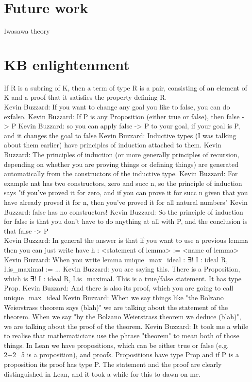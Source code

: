 \documentclass[10pt, a4paper]{article}
\begin{document}
\section{Future work}
Iwasawa theory

\section{KB enlightenment}
If R is a subring of K, then a term of type R is a pair, consisting of an element of K and a proof that it satisfies the property defining R. \\

Kevin Buzzard: If you want to change any goal you like to false, you can do exfalso.
Kevin Buzzard: If P is any Proposition (either true or false), then false -> P
Kevin Buzzard: so you can apply false -> P to your goal, if your goal is P, and it changes the goal to false
Kevin Buzzard: Inductive types (I was talking about them earlier) have principles of induction attached to them.
Kevin Buzzard: The principles of induction (or more generally principles of recursion, depending on whether you are proving things or defining things) are generated automatically from the constructors of the inductive type.
Kevin Buzzard: For example nat has two constructors, zero and succ n, so the principle of induction says "if you've proved it for zero, and if you can prove it for succ n given that you have already proved it for n, then you've proved it for all natural numbers"
Kevin Buzzard: false has no constructors!
Kevin Buzzard: So the principle of induction for false is that you don't have to do anything at all with P, and the conclusion is that false -> P \\

Kevin Buzzard: In general the answer is that if you want to use a previous lemma then you can just write have h : <statement of lemma> := <name of lemma>
Kevin Buzzard: When you write lemma unique_max_ideal : ∃! I : ideal R, I.is_maximal := ...
Kevin Buzzard: you are saying this. There is a Proposition, which is ∃! I : ideal R, I.is_maximal. This is a true/false statement. It has type Prop.
Kevin Buzzard: And there is also its proof, which you are going to call unique_max_ideal
Kevin Buzzard: When we say things like "the Bolzano Weierstrass theorem says (blah)" we are talking about the statement of the theorem. When we say "by the Bolzano Weierstrass theorem we deduce (blah)", we are talking about the proof of the theorem.
Kevin Buzzard: It took me a while to realise that mathematicians use the phrase "theorem" to mean both of those things. In Lean we have propositions, which can be either true or false (e.g. 2+2=5 is a proposition), and proofs. Propositions have type Prop and if P is a proposition its proof has type P. The statement and the proof are clearly distinguished in Lean, and it took a while for this to dawn on me. \\
\end{document}

